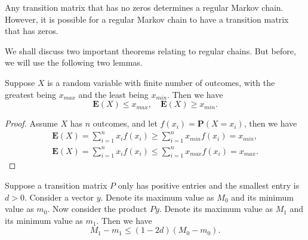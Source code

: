 \begin{remark}
Any transition matrix that has no zeros determines a regular Markov chain. However, it is possible for a regular Markov chain to have a transition matrix that has zeros.
\end{remark}

We shall discuss two important theorems relating to regular chains. But before, we will use the following two lemmas.

\begin{lemma}
\label{lemma:8.1}
Suppose $X$ is a random variable with finite number of outcomes, with the greatest being $x_{max}$ and the least being $x_{min}$. Then we have 
\begin{equation*}
    \mathbf{E}(X) \leq x_{max}, \quad \mathbf{E}(X) \geq x_{min}.
\end{equation*}
\end{lemma}

\begin{proof}
Assume $X$ has $n$ outcomes, and let $f(x_i) = \mathbf{P}(X = x_i)$, then we have
\begin{gather*}
    \mathbf{E}(X) = \sum_{i=1}^n x_i f(x_i) \geq \sum_{i=1}^n x_{min} f(x_i) = x_{min}, \\
    \mathbf{E}(X) = \sum_{i=1}^n x_i f(x_i) \leq \sum_{i=1}^n x_{max} f(x_i) = x_{max}.
\end{gather*}
\end{proof}

\begin{lemma}
\label{lemma:8.2}
Suppose a transition matrix $P$ only has positive entries and the smallest entry is $d>0$. Consider a vector $y$. Denote its maximum value as $M_0$ and its minimum value as $m_0$. Now consider the product $Py$. Denote its maximum value as $M_1$ and its minimum value as $m_1$. Then we have
\begin{equation*}
    M_1 - m_1 \leq (1-2d) (M_0 - m_0).
\end{equation*}
\end{lemma}


